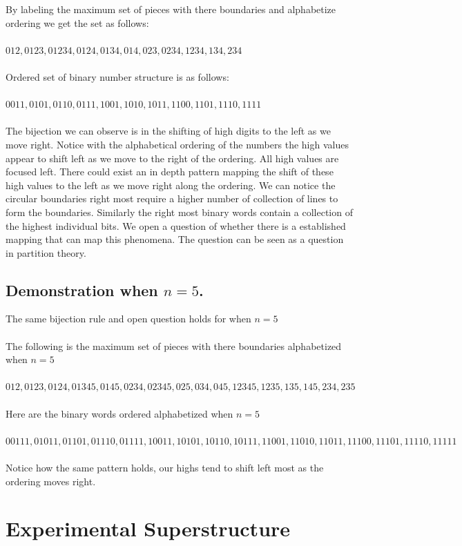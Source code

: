 \documentclass[a4paper,10pt]{article}
\begin{document}
By labeling the maximum set of pieces with there boundaries and alphabetize ordering we get the set as follows:\\
\\
${012,0123,01234,0124,0134,014,023,0234,1234,134,234}$ \\
\\
Ordered set of binary number structure is as follows:\\
\\
${0011, 0101, 0110, 0111, 1001, 1010, 1011, 1100, 1101, 1110, 1111}$\\
\\
The bijection we can observe is in the shifting of high digits to the left as we move right. Notice with the alphabetical ordering of the numbers the high values appear to shift left as we move to the right of the ordering. All high values are focused left. There could exist an in depth pattern mapping the shift of these high values to the left as we move right along the ordering. We can notice the circular boundaries right most require a higher number of collection of lines to form the boundaries. Similarly the right most binary words contain a collection of the highest individual bits. We open a question of whether there is a established mapping that can map this phenomena. The question can be seen as a question in partition theory.  

\subsection{Demonstration when $n=5$.}
The same bijection rule and open question holds for when $n=5$\\
\\
The following is the maximum set of pieces with there boundaries alphabetized when $n = 5$\\
\\
${012,0123,0124,01345,0145,0234,02345,025,034,045,12345,1235,135,145,234,235}$\\
\\
Here are the binary words ordered alphabetized when $n=5$\\
\\
${00111, 01011, 01101, 01110, 01111, 10011, 10101, 10110, 10111, 11001, 11010, 11011, 11100, 11101, 11110, 11111}$\\
\\
Notice  how the same pattern holds, our highs tend to shift left most as the ordering moves right.
\section{Experimental Superstructure}
\end{document}
